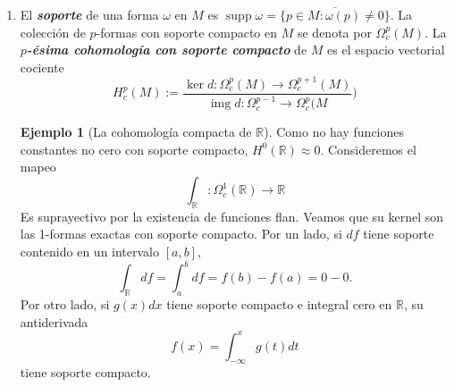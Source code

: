 \documentclass[spanish]{article}
\theoremstyle{definition}
\newtheorem*{ejem}{Ejemplo}
\newcommand{\R}{\mathbb{R}}
\DeclareMathOperator{\img}{img}
\DeclareMathOperator{\supp}{supp}
\begin{document}
\begin{enumerate}
\begin{enumerate}
			\item (Mayer-Vietoris). Supongamos que $\{U,V\}$ es una cubierta abierta de $M$. Las inclusiones
			\[\begin{tikzcd}[column sep=small,row sep=small]
				&U\arrow[dr,"k"]\\
				U\cap V\arrow[ru,"i"]\arrow[dr,swap,"j"]&&M\\
				&V\arrow[ru,swap,"l"]
			\end{tikzcd}\]
			inducen la siguiente sucesión exacta larga en cohomología:
			\[\begin{tikzcd}[column sep=small]
				\cdots\arrow[r,"\delta"]&H_{dR}^p(M)\arrow[r,"k^*\oplus l^*"]&H_{dR}^p(U)\oplus H_{dR}^p(V)\arrow[r,"i^*-j^*"]&H_{dR}^p(U\cap V)\arrow[r,"\delta"]&H_{dR}^{p+1}(M)\arrow[r,"k^*\oplus l^*"]&\cdots
			\end{tikzcd}\]
		\end{enumerate}
		
		\item El \textbf{\textit{soporte}} de una forma $\omega$ en $M$ es $\supp \omega=\overline{\{p\in M:\omega(p)\neq0\}}$. La colección de $p$-formas con soporte compacto en $M$ se denota por $\Omega_c^p(M)$. La \textbf{\textit{$p$-ésima cohomología con soporte compacto}} de $M$ es el espacio vectorial cociente
		\[H^p_c(M):=\frac{\ker d:\Omega_c^p(M)\to \Omega_c^{p+1}(M)}{\img d:\Omega_c^{p-1}\to\Omega_c^p(M})\]
			\begin{ejem}[La cohomología compacta de $\R$]
			Como no hay funciones constantes no cero con soporte compacto, $H^0(\R)\approx 0$. Consideremos el mapeo
			\[\int_\R:\Omega_c^1(\R)\to\R\]
			Es suprayectivo por la existencia de funciones flan. Veamos que su kernel son las 1-formas exactas con soporte compacto. Por un lado, si $df$ tiene soporte contenido en un intervalo $[a,b]$,
			\[\int_\R df=\int_a^bdf=f(b)-f(a)=0-0.\]
			Por otro lado, si $g(x)dx$ tiene soporte compacto e integral cero en $\R$, su antiderivada
			\[f(x)=\int_{-\infty}^xg(t)dt\]
			tiene soporte compacto.			
		\end{ejem}
	\end{enumerate}

	\iffalse
	\begin{ejem}
		En general,
		\[H^p_c(\R^n)\approx\begin{cases}
			\begin{aligned}
				0\qquad&\text{si }p< n\\
				\R\qquad&\text{si }p=n
			\end{aligned}
		\end{cases}\]
	\end{ejem}
	\fi
	
\end{document}
